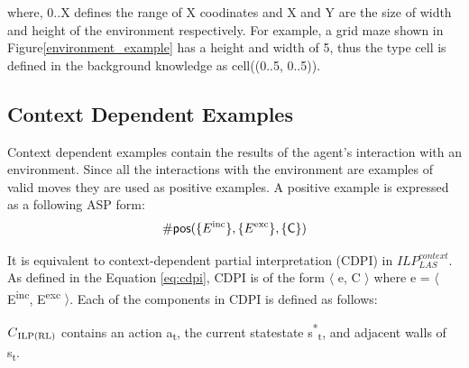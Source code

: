 where, 0..X defines the range of X coodinates and X and Y are the size of width and height of the environment respectively. 
For example, a grid maze shown in Figure\ref{environment_example} has a height and width of 5, thus the type cell is defined in the background knowledge as \textsf{cell((0..5, 0..5))}.



\subsection{Context Dependent Examples}
Context dependent examples contain the results of the agent's interaction with an environment. 
Since all the interactions with the environment are examples of valid moves
they are used as positive examples. A positive example is expressed as a following ASP form:
\begin{equation}
\begin{split}
    \textsf{\#pos}(\{E\textsuperscript{inc}\}, \{E\textsuperscript{exc}\}, \textsf{\{C\}})
\end{split}
\end{equation}

It is equivalent to context-dependent partial interpretation (CDPI) in  $ILP_{LAS}^{context}$. 
As defined in the Equation \ref{eq:cdpi}, CDPI is of the form $\langle$ e, C $\rangle$ where e = $\langle$ E\textsuperscript{inc}, E\textsuperscript{exc} $\rangle$. 
Each of the components in CDPI is defined as follows:

\begin{defn}\label{def:ILPRL_context}
$C\textsubscript{ILP(RL)}$ contains an action a\textsubscript{t}, the current statestate s\textsuperscript{*}\textsubscript{t}, and adjacent walls of s\textsubscript{t}.
\label{def:context}
\end{defn}

